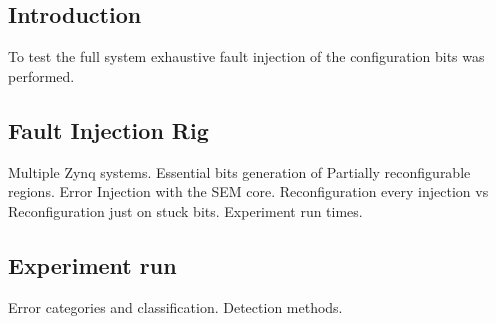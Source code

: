 
\subsection{Introduction}
To test the full system exhaustive fault injection of the configuration bits was performed.

\subsection{Fault Injection Rig}
Multiple Zynq systems. Essential bits generation of Partially reconfigurable regions.
Error Injection with the SEM core. Reconfiguration every injection vs Reconfiguration just
on stuck bits. Experiment run times.

\subsection{Experiment run}
Error categories and classification.
Detection methods.

